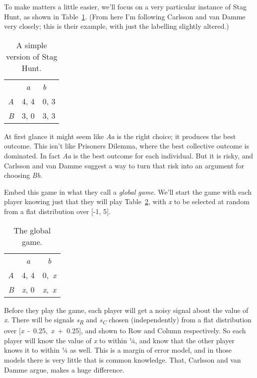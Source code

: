 \documentclass[
  12pt,
  letterpaper,
]{scrbook}
\begin{document}
To make matters a little easier, we'll focus on a very particular
instance of Stag Hunt, as shown in Table~\ref{tbl-stag-hunt}. (From here
I'm following Carlsson and van Damme very closely; this is their
example, with just the labelling slightly altered.)

\begin{longtable}[]{@{}rcl@{}}
\caption{A simple version of Stag
Hunt.}\label{tbl-stag-hunt}\tabularnewline
\toprule\noalign{}
\endfirsthead
\endhead
\bottomrule\noalign{}
\endlastfoot
& \emph{a} & \emph{b} \\
\emph{A} & 4, 4 & 0, 3 \\
\emph{B} & 3, 0 & 3, 3 \\
\end{longtable}

At first glance it might seem like \emph{Aa} is the right choice; it
produces the best outcome. This isn't like Prisoners Dilemma, where the
best collective outcome is dominated. In fact \emph{Aa} is the best
outcome for each individual. But it is risky, and Carlsson and van Damme
suggest a way to turn that risk into an argument for choosing \emph{Bb}.

Embed this game in what they call a \emph{global game}. We'll start the
game with each player knowing just that they will play
Table~\ref{tbl-global-game}, with \emph{x} to be selected at random from
a flat distribution over {[}-1, 5{]}.

\begin{longtable}[]{@{}rcc@{}}
\caption{The global game.}\label{tbl-global-game}\tabularnewline
\toprule\noalign{}
\endfirsthead
\endhead
\bottomrule\noalign{}
\endlastfoot
& \emph{a} & \emph{b} \\
\emph{A} & 4, 4 & 0,~\emph{x} \\
\emph{B} & \emph{x}, 0 & \emph{x},~\emph{x} \\
\end{longtable}

Before they play the game, each player will get a noisy signal about the
value of \emph{x}. There will be signals \emph{s\textsubscript{R}} and
\emph{s\textsubscript{C}} chosen (independently) from a flat
distribution over {[}\emph{x}~-~0.25,~\emph{x}~+~0.25{]}, and shown to
Row and Column respectively. So each player will know the value of
\emph{x} to within ¼, and know that the other player knows it to within
¼ as well. This is a margin of error model, and in those models there is
very little that is common knowledge. That, Carlsson and van Damme
argue, makes a huge difference.
\end{document}

